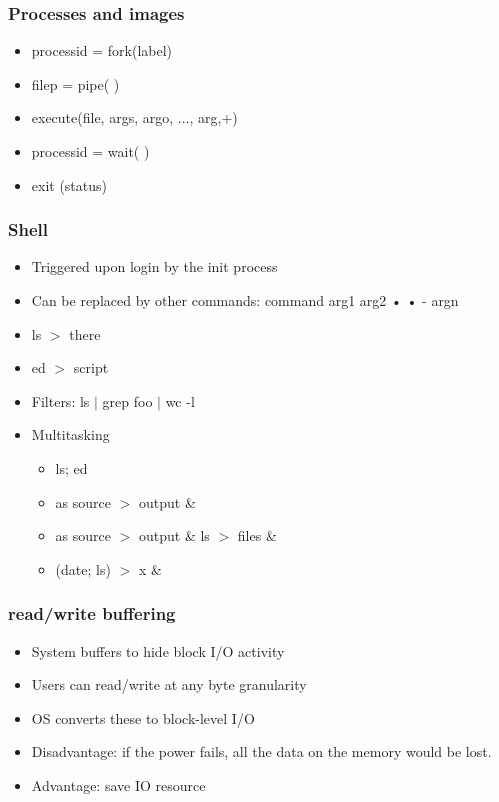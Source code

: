 \documentclass[12pt]{article}
\begin{document}
\subsubsection{Processes and images}
\begin{itemize}
    \item processid = fork(label) 
    \item filep = pipe( ) 
    \item execute(file, args, argo, ..., arg,+) 
    \item processid = wait( ) 
    \item exit (status)
\end{itemize}
\subsubsection{Shell}
\begin{itemize}
    \item Triggered upon login by the init process 
    \item Can be replaced by other commands: command arg1 arg2 • • - argn 
    \item ls $>$ there 
    \item ed $>$ script 
    \item Filters: ls $|$ grep foo $|$ wc -l 
    \item Multitasking \begin{itemize}
        \item ls; ed
        \item as source $>$ output \&
        \item as source $>$ output \& ls $>$ files \&
        \item (date; ls) $>$ x \&
    \end{itemize}
\end{itemize}
\subsubsection{read/write buffering}
\begin{itemize}
    \item System buffers to hide block I/O activity 
    \item Users can read/write at any byte granularity 
    \item OS converts these to block-level I/O
    \item Disadvantage: if the power fails, all the data on the memory would be lost.
    \item Advantage: save IO resource
\end{itemize}
\end{document}
